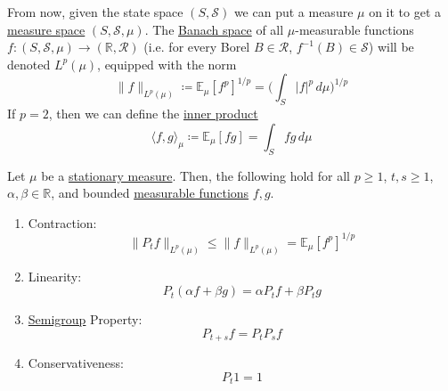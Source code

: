   From now, given the state space $(S, \mathcal{S})$ we can put a measure $\mu$ on it to get a \hyperref[mt-def:measure-space]{measure space} $(S, \mathcal{S}, \mu)$. The \hyperref[mv-def:banach-space]{Banach space} of all $\mu$-measurable functions $f: (S, \mathcal{S}, \mu) \rightarrow (\mathbb{R}, \mathcal{R})$ (i.e. for every Borel $B \in \mathcal{R}$, $f^{-1}(B) \in \mathcal{S}$) will be denoted $L^p (\mu)$, equipped with the norm 
  \begin{equation}
    \|f\|_{L^p(\mu)} \coloneqq \mathbb{E}_\mu [f^p]^{1/p} = \bigg( \int_S |f|^p \,d\mu \bigg)^{1/p}
  \end{equation}
  If $p = 2$, then we can define the \hyperref[lin-def:inner-product]{inner product} 
  \begin{equation}
    \langle f, g \rangle_\mu \coloneqq \mathbb{E}_\mu [f g] = \int_S f g \, d\mu
  \end{equation}

  \begin{lemma}
    \label{thm:contraction-properties-of-a-stationary-semigroup}
  Let $\mu$ be a \hyperref[def:stationary-measure]{stationary measure}. Then, the following hold for all $p \geq 1$, $t, s \geq 1$, $\alpha, \beta \in \mathbb{R}$, and bounded \hyperref[mt-def:measurable-function]{measurable functions} $f, g$. 
  \begin{enumerate}
      \item Contraction: 
      \begin{equation}
        \|P_t f\|_{L^p(\mu)} \leq \|f\|_{L^p (\mu)} = \mathbb{E}_\mu [f^p]^{1/p}
      \end{equation}
      
      \item Linearity: 
      \begin{equation}
        P_t (\alpha f + \beta g) = \alpha P_t f + \beta P_t g
      \end{equation}
       
      
      \item \hyperref[alg-def:semigroup]{Semigroup} Property: 
      \begin{equation}
        P_{t + s} f = P_t P_s f
      \end{equation}
      
      \item Conservativeness: 
      \begin{equation}
        P_t 1 = 1
      \end{equation}
  \end{enumerate}
  \end{lemma}

